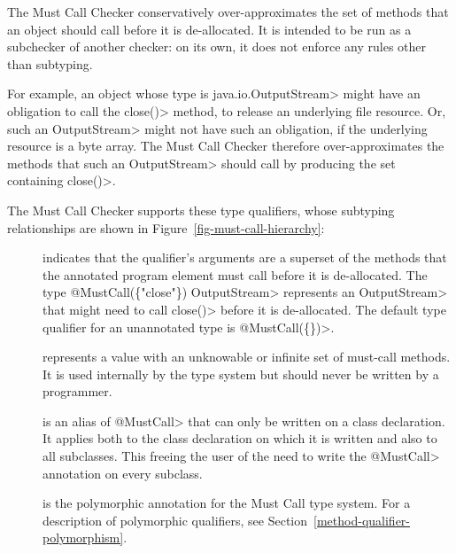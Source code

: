 \htmlhr
{}

The Must Call Checker conservatively over-approximates
the set of methods that an object should call before it is de-allocated.
It is intended to be run as a subchecker of another checker: on its own, it does not
enforce any rules other than subtyping.

For example, an object whose type is \<java.io.OutputStream> might
have an obligation to call the \<close()> method, to release an underlying file resource. Or,
such an \<OutputStream> might not have such an obligation, if the underlying resource is
a byte array. The Must Call Checker therefore over-approximates the methods that such an
\<OutputStream> should call by producing the set containing \<close()>.


The Must Call Checker supports these type qualifiers, whose subtyping relationships
are shown in Figure~\ref{fig-must-call-hierarchy}:

\begin{description}

\item[]
  indicates that the qualifier's arguments are a superset of the methods that the annotated program element
  must call before it is de-allocated.
  The type \<@MustCall(\{"close"\}) OutputStream> represents an \<OutputStream> that might need
  to call \<close()> before it is de-allocated.
  The default type qualifier for an unannotated type is \<@MustCall(\{\})>.

\item[]
  represents a value with an unknowable or infinite set of must-call methods.
  It is used internally by the type system but should never be written by a
  programmer.

\item[]
  is an alias of \<@MustCall> that can only be written on a class declaration.
  It applies both to the class declaration on which it is written and also to all subclasses.
  This freeing the user of the need to write the \<@MustCall> annotation on every subclass.

\item[]
  is the polymorphic annotation for the Must Call type system.
  For a description of polymorphic qualifiers, see
  Section~\ref{method-qualifier-polymorphism}.

\end{description}

